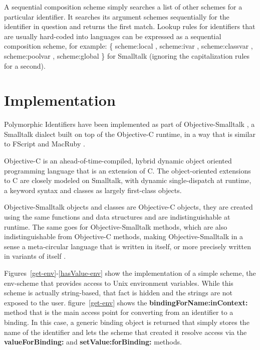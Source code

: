 \documentclass[preprint,authoryear]{acm_proc_article-sp}
\begin{document}
A sequential composition scheme simply searches a list of other schemes
for a particular identifier.  It searches its argument schemes sequentially
for the identifier in question and returns the first match.  Lookup rules for
identifiers that are usually hard-coded into languages can be expressed
as a sequential composition scheme, for example:   \{ scheme:local ,
scheme:ivar , scheme:classvar , scheme:poolvar , scheme:global \} for Smalltalk 
(ignoring the capitalization rules for a second).



\section{Implementation}

Polymorphic Identifiers have been implemented as part of Objective-Smalltalk \cite{objst},
a Smalltalk dialect built on top of the Objective-C\cite{objc-evol}\cite{objc-apple} runtime, 
in a way that is similar to FScript\cite{fscript} and MacRuby \cite{macruby}.

Objective-C is an ahead-of-time-compiled, hybrid dynamic object oriented programming language
that is an extension of C.  The object-oriented extensions to C are closely modeled on
Smalltalk, with dynamic single-dispatch at runtime, a keyword syntax and classes as
largely first-class objects.

Objective-Smalltalk objects and classes are Objective-C objects, they are created using
the same functions and data structures and are indistinguishable at runtime.
The same goes for Objective-Smalltalk methods, which are also indistinguishable from
Objective-C methods, making Objective-Smalltalk in a sense a meta-circular language
that is written in itself, or more precisely written in variants of itself \cite{kleinvm}\cite{squeak}.

Figures~\ref{get-env}-\ref{hasValue-env} show the implementation of a simple scheme,
the env-scheme that provides access to Unix environment variables.  While this scheme
is actually string-based, that fact is hidden and the strings are not exposed to the user.
figure~\ref{get-env}
shows the {\bf bindingForName:inContext:} method that is the main access point for
converting from an identifier to a binding.  In this case, a generic binding object is returned
that simply stores the name of the identifier and lets the scheme that created it resolve
access via the {\bf valueForBinding:} and {\bf setValue:forBinding:} methods.
\end{document}
